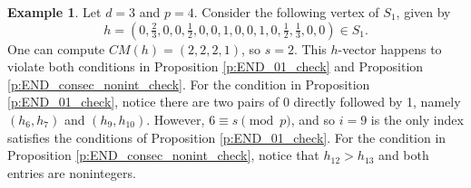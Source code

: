 \documentclass[12pt]{amsart}
\theoremstyle{definition}
\newtheorem{example}[thm]{Example}
\numberwithin{equation}{section}
\renewcommand\>{\rangle}
\newcommand\<{\langle}
\newcommand\0{\mathbf{0}}
\begin{document}
\begin{example}
	Let $d=3$ and $p = 4$. Consider the following vertex of $S_1$, given by
	\[h = (0,\tfrac{2}{3},0,0,\tfrac{1}{2},0,0,1,0,0,1,0,\tfrac{1}{2},\tfrac{1}{3},0,0) \in S_1.\]
	One can compute $CM(h) = (2,2,2,1)$, so $s = 2$. This $h$-vector happens to violate both conditions in Proposition \ref{p:END_01_check} and Proposition \ref{p:END_consec_nonint_check}. 
	For the condition in Proposition \ref{p:END_01_check}, notice there are two pairs of 0 directly followed by 1, namely $(h_6, h_7)$ and $(h_9, h_{10})$. However, $6 \equiv s \pmod p $, and so $i = 9$ is the only index satisfies the conditions of Proposition \ref{p:END_01_check}.
	For the condition in Proposition \ref{p:END_consec_nonint_check}, notice that $h_{12} > h_{13}$ and both entries are nonintegers.
\end{example}
\end{document}
